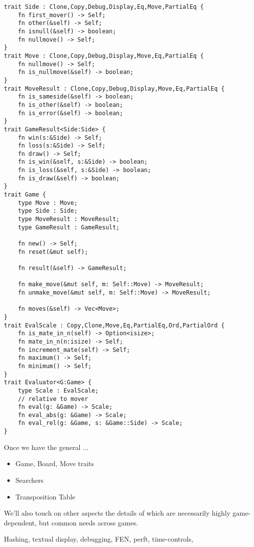 \documentclass[10pt,dvipdfmx]{report}
\begin{document}
{\scriptsize
\begin{verbatim}
trait Side : Clone,Copy,Debug,Display,Eq,Move,PartialEq {
    fn first_mover() -> Self;
    fn other(&self) -> Self;
    fn isnull(&self) -> boolean;
    fn nullmove() -> Self;
}
trait Move : Clone,Copy,Debug,Display,Move,Eq,PartialEq {
    fn nullmove() -> Self;
    fn is_nullmove(&self) -> boolean;
}
trait MoveResult : Clone,Copy,Debug,Display,Move,Eq,PartialEq {
    fn is_sameside(&self) -> boolean;
    fn is_other(&self) -> boolean;
    fn is_error(&self) -> boolean;
}
trait GameResult<Side:Side> {
    fn win(s:&Side) -> Self;
    fn loss(s:&Side) -> Self;
    fn draw() -> Self;
    fn is_win(&self, s:&Side) -> boolean;
    fn is_loss(&self, s:&Side) -> boolean;
    fn is_draw(&self) -> boolean;
}
trait Game {
    type Move : Move;
    type Side : Side;
    type MoveResult : MoveResult;
    type GameResult : GameResult;

    fn new() -> Self;
    fn reset(&mut self);

    fn result(&self) -> GameResult;

    fn make_move(&mut self, m: Self::Move) -> MoveResult;
    fn unmake_move(&mut self, m: Self::Move) -> MoveResult;

    fn moves(&self) -> Vec<Move>;
}
trait EvalScale : Copy,Clone,Move,Eq,PartialEq,Ord,PartialOrd {
    fn is_mate_in_n(self) -> Option<isize>;
    fn mate_in_n(n:isize) -> Self;
    fn increment_mate(self) -> Self;
    fn maximum() -> Self;
    fn minimum() -> Self;
}
trait Evaluator<G:Game> {
    type Scale : EvalScale;
    // relative to mover
    fn eval(g: &Game) -> Scale;
    fn eval_abs(g: &Game) -> Scale;
    fn eval_rel(g: &Game, s: &Game::Side) -> Scale;
}
\end{verbatim}
}

Once we have the general ...

\begin{itemize}
    \item Game, Board, Move traits
    \item Searchers
    \item Transposition Table
\end{itemize}

We'll also touch on other aspects the details of which are necessarily
highly game-dependent, but common needs across games.

Hashing, textual display, debugging, FEN,
perft, time-controls, 



\end{document}
